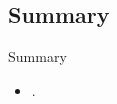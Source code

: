 \subsection{Summary}

\begin{frame}
  \begin{block}{Summary}
    \begin{itemize}
      \item .
    \end{itemize}
  \end{block}
\end{frame}